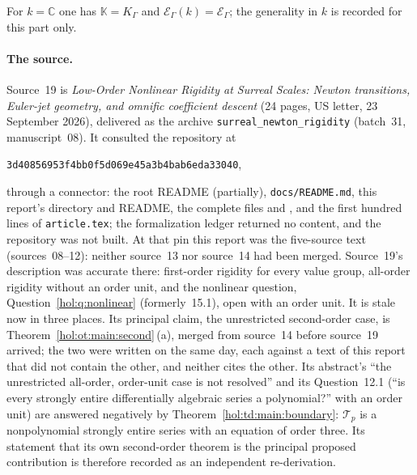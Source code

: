 \documentclass[11pt]{article}
\numberwithin{equation}{section}
\theoremstyle{definition}
\theoremstyle{remark}
\newcommand{\C}{\mathbb C}
\newcommand{\K}{K_\Gamma}
\newcommand{\E}{\mathcal E_\Gamma}
\newcommand{\KK}{\mathbb K}
\newcommand{\EK}{\mathcal E_\Gamma(k)}
\begin{document}
For $k=\C$ one has $\KK=\K$ and $\EK=\E$; the generality in $k$ is recorded for
this part only.

\paragraph{The source.}
Source~19 is \emph{Low-Order Nonlinear Rigidity at Surreal Scales: Newton
transitions, Euler-jet geometry, and omnific coefficient descent} (24 pages,
US letter, 23 September 2026), delivered as the archive
\texttt{surreal\_newton\_rigidity} (batch~31, manuscript~08). It consulted the
repository at
\begin{center}\small\texttt{3d40856953f4bb0f5d069e45a3b4bab6eda33040},\end{center}
through a connector: the root README (partially), \texttt{docs/README.md}, this
report's directory and README, the complete files
 and
, and the first
hundred lines of \texttt{article.tex}; the formalization ledger returned no
content, and the repository was not built. At that pin this report was the
five-source text (sources~08--12): neither source~13 nor source~14 had been
merged. Source~19's description was accurate there: first-order rigidity for
every value group, all-order rigidity without an order unit, and the
nonlinear question, Question~\ref{hol:q:nonlinear} (formerly~15.1), open with
an order unit. It is stale now in three places. Its principal claim, the
unrestricted second-order case, is Theorem~\ref{hol:ot:main:second}\,(a),
merged from source~14 before source~19 arrived; the two were written on the
same day, each against a text of this report that did not contain the other,
and neither cites the other. Its
abstract's ``the unrestricted all-order, order-unit case is not resolved'' and
its Question~12.1 (``is every strongly entire differentially algebraic series a
polynomial?'' with an order unit) are answered negatively by
Theorem~\ref{hol:td:main:boundary}: $\mathcal T_p$ is a nonpolynomial strongly
entire series with an equation of order three. Its statement that its own
second-order theorem is the principal proposed contribution is therefore
recorded as an independent re-derivation.
\end{document}
